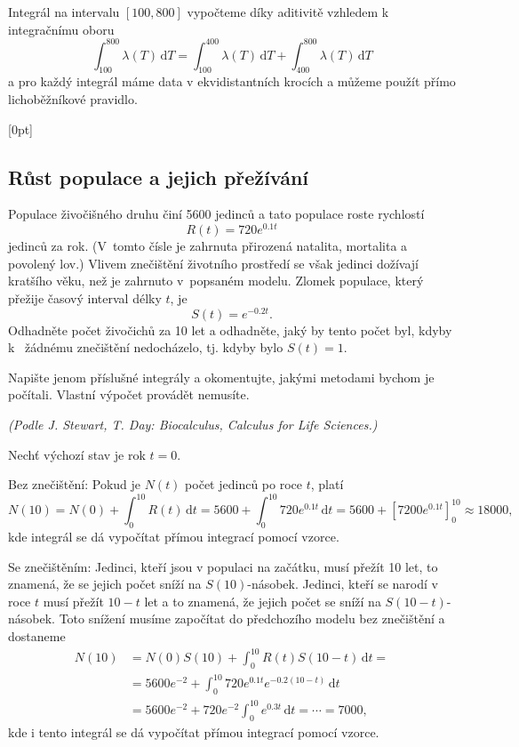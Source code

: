 Integrál na intervalu $[100,800]$ vypočteme díky aditivitě vzhledem k
integračnímu oboru
$$\int_{100}^{800}\lambda(T)\,\mathrm dT=\int_{100}^{400}\lambda(T)\,\mathrm dT+\int_{400}^{800}\lambda(T)\,\mathrm dT$$
a pro každý integrál máme data v ekvidistantních krocích a můžeme
použít přímo lichoběžníkové pravidlo.
\konec

\stranka





[0pt]

\def\mezera{\vspace*{10pt}}

\subsection{Růst populace a jejich přežívání}  Populace živočišného druhu
činí 5600 jedinců a tato populace roste rychlostí
$$R(t)=720 e^{0.1t}$$ jedinců za rok. (V tomto čísle je zahrnuta
přirozená natalita, mortalita a povolený lov.) Vlivem znečištění
životního prostředí se však jedinci dožívají kratšího věku, než je
zahrnuto v popsaném modelu. Zlomek populace, který přežije časový interval délky $t$,
je $$S(t)=e^{-0.2t}.$$ Odhadněte počet živočichů za 10 let a
odhadněte, jaký by tento počet byl, kdyby k~ žádnému znečištění
nedocházelo, tj. kdyby bylo $S(t)=1$.

Napište jenom příslušné integrály a okomentujte, jakými metodami
bychom je počítali. Vlastní výpočet provádět nemusíte.

\textit{(Podle J. Stewart, T. Day: Biocalculus,  Calculus for Life Sciences.)}

\reseni
Nechť výchozí stav je rok $t=0$.

Bez znečištění:
Pokud je $N(t)$ počet jedinců po roce $t$, platí
$$N(10)=N(0)+\int_0^{10} R(t)\,\mathrm dt=5600+\int_0^{10} 720 e^{0.1 t}\,\mathrm dt=
5600+\left[7200 e^{0.1t}\right]_0^{10}\approx 18000,
$$
kde integrál se dá vypočítat přímou integrací pomocí vzorce.

Se znečištěním: Jedinci, kteří jsou v populaci na začátku, musí přežít 10 let, to znamená, že se jejich počet sníží na $S(10)$-násobek. Jedinci, kteří se narodí v roce $t$ musí přežít $10-t$ let a to znamená, že jejich počet se sníží na $S(10-t)$-násobek. Toto snížení musíme započítat do předchozího modelu bez znečištění a dostaneme
$$
\begin{aligned}
N(10)&=N(0)S(10)+\int_0^{10} R(t)S(10-t)\,\mathrm dt=\\&=5600 e^{-2}+\int_0^{10} 720 e^{0.1 t}e^{-0.2(10-t)}\,\mathrm dt\\&=
5600 e^{-2}+720 e^{-2} \int_0^{10}  e^{0.3 t}\,\mathrm dt=
\cdots =7000,
\end{aligned}
$$
kde i tento integrál se dá vypočítat přímou integrací pomocí vzorce.

